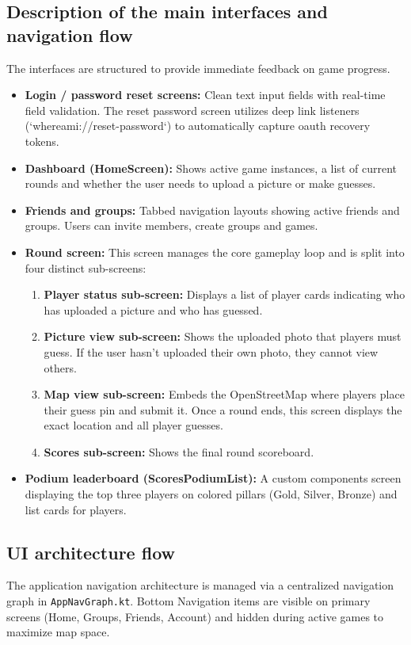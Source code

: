 \documentclass[11pt,a4paper]{article}
\begin{document}
\subsection{Description of the main interfaces and navigation flow}
The interfaces are structured to provide immediate feedback on game progress.
\begin{itemize}
    \item \textbf{Login / password reset screens:} Clean text input fields with real-time field validation. The reset password screen utilizes deep link listeners (`whereami://reset-password`) to automatically capture oauth recovery tokens.
    \item \textbf{Dashboard (HomeScreen):} Shows active game instances, a list of current rounds and whether the user needs to upload a picture or make guesses.
    \item \textbf{Friends and groups:} Tabbed navigation layouts showing active friends and groups. Users can invite members, create groups and games.
    \item \textbf{Round screen:} This screen manages the core gameplay loop and is split into four distinct sub-screens:
        \begin{enumerate}
            \item \textbf{Player status sub-screen:} Displays a list of player cards indicating who has uploaded a picture and who has guessed.
            \item \textbf{Picture view sub-screen:} Shows the uploaded photo that players must guess. If the user hasn't uploaded their own photo, they cannot view others.
            \item \textbf{Map view sub-screen:} Embeds the OpenStreetMap where players place their guess pin and submit it. Once a round ends, this screen displays the exact location and all player guesses.
            \item \textbf{Scores sub-screen:} Shows the final round scoreboard.
        \end{enumerate}
    \item \textbf{Podium leaderboard (ScoresPodiumList):} A custom components screen displaying the top three players on colored pillars (Gold, Silver, Bronze) and list cards for players.
\end{itemize}

\subsection{UI architecture flow}
The application navigation architecture is managed via a centralized navigation graph in \texttt{AppNavGraph.kt}. Bottom Navigation items are visible on primary screens (Home, Groups, Friends, Account) and hidden during active games to maximize map space.
\end{document}

